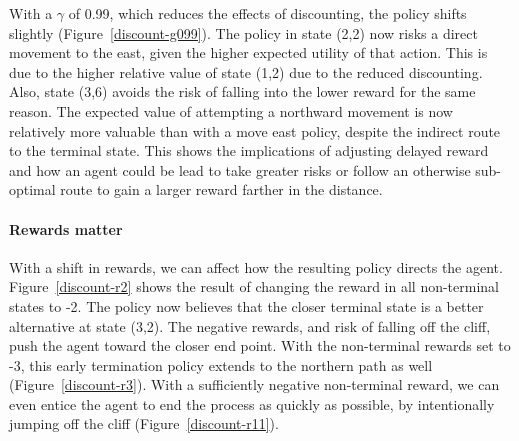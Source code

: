 \documentclass{sig-alternate}
\begin{document}
With a $\gamma$ of 0.99, which reduces the effects of discounting, the policy shifts slightly (Figure~\ref{discount-g099}). The policy in state (2,2) now risks a direct movement to the east, given the higher expected utility of that action. This is due to the higher relative value of state (1,2) due to the reduced discounting. Also, state (3,6) avoids the risk of falling into the lower reward for the same reason. The expected value of attempting a northward movement is now relatively more valuable than with a move east policy, despite the indirect route to the terminal state. This shows the implications of adjusting delayed reward and how an agent could be lead to take greater risks or follow an otherwise sub-optimal route to gain a larger reward farther in the distance.

\paragraph{Rewards matter}

With a shift in rewards, we can affect how the resulting policy directs the agent. Figure~\ref{discount-r2} shows the result of changing the reward in all non-terminal states to -2. The policy now believes that the closer terminal state is a better alternative at state (3,2). The negative rewards, and risk of falling off the cliff, push the agent toward the closer end point. With the non-terminal rewards set to -3, this early termination policy extends to the northern path as well (Figure~\ref{discount-r3}). With a sufficiently negative non-terminal reward, we can even entice the agent to end the process as quickly as possible, by intentionally jumping off the cliff (Figure~\ref{discount-r11}).
\end{document}
